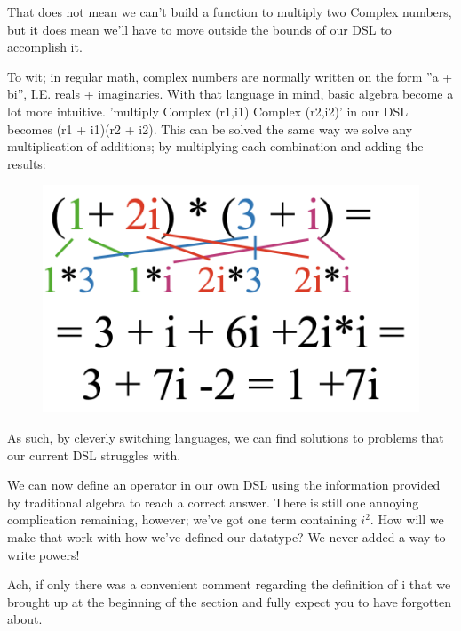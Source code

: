 That does not mean we can't build a function to multiply two Complex numbers, but it does mean we'll have to move outside the bounds of our DSL to accomplish it.

To wit; in regular math, complex numbers are normally written on the form ''a + bi'', I.E. reals + imaginaries. With that language in mind, basic algebra become a lot more intuitive. 'multiply Complex (r1,i1) Complex (r2,i2)' in our DSL becomes (r1 + i1)(r2 + i2). This can be solved the same way we solve any multiplication of additions; by multiplying each combination and adding the results:

\begin{figure}[h!]
    \centering
    \includegraphics[scale= 0.3]{mult.png}
    \caption{}
    \label{mult}
\end{figure}

As such, by cleverly switching languages, we can find solutions to problems that our current DSL struggles with.

We can now define an operator in our own DSL using the information provided by traditional algebra to reach a correct answer. There is still one annoying complication remaining, however; we've got one term containing $i^2$. How will we make that work with how we've defined our datatype? We never added a way to write powers!

Ach, if only there was a convenient comment regarding the definition of i that we brought up at the beginning of the section and fully expect you to have forgotten about.

